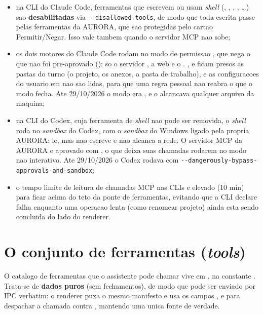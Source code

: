 \begin{itemize}[leftmargin=1.4em]
  \item na CLI do Claude Code, ferramentas que escrevem ou usam \emph{shell}
        (, , , ,
         \dots) sao \textbf{desabilitadas} via
        \lstinline|--disallowed-tools|, de modo que toda escrita passe pelas
        ferramentas da AURORA, que sao protegidas pelo cartao Permitir/Negar.
        Isso vale tambem quando o servidor MCP nao sobe;
  \item os dois motores do Claude Code rodam no modo de permissao
        , que nega o que nao foi pre-aprovado
        (): so o servidor , a
        web e o . ,  e  ficam
        presos as pastas do turno (o projeto, os anexos, a pasta de trabalho), e
        as configuracoes do usuario em  nao sao lidas, para que
        uma regra  pessoal nao reabra o que o modo fecha. Ate
        29/10/2026 o modo era , e o  alcancava
        qualquer arquivo da maquina;
  \item na CLI do Codex, cuja ferramenta de \emph{shell} nao pode ser removida,
        o \emph{shell} roda no \emph{sandbox}  do Codex, com o
        \emph{sandbox} do Windows ligado pela propria AURORA: le, mas nao
        escreve e nao alcanca a rede. O servidor MCP da AURORA e aprovado com
        , o que deixa suas
        chamadas rodarem no modo nao interativo. Ate 29/10/2026 o Codex rodava
        com \lstinline|--dangerously-bypass-approvals-and-sandbox|;
  \item o tempo limite de leitura de chamadas MCP nas CLIs e elevado (10 min) para
        ficar acima do teto da ponte de ferramentas, evitando que a CLI declare
        falha enquanto uma operacao lenta (como renomear projeto) ainda esta sendo
        concluida do lado do renderer.
\end{itemize}

\section{O conjunto de ferramentas (\emph{tools})}

O catalogo de ferramentas que o assistente pode chamar vive em
, na constante . Trata-se de
\textbf{dados puros} (sem fechamentos), de modo que pode ser enviado por IPC
verbatim: o renderer puxa o mesmo manifesto e usa os campos ,
 e  para despachar a chamada contra
, mantendo uma unica fonte de verdade.

